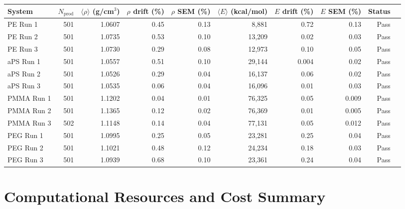\documentclass[journal=acsami,manuscript=suppinfo]{achemso}
\begin{document}
\begin{adjustbox}{max width=\textwidth}
\begin{tabular}{lrrrrrrrrl}
\toprule
\textbf{System} & $N_{\text{prod}}$ & $\langle \rho \rangle$ (g/cm$^3$) & $\rho$ drift (\%) & $\rho$ SEM (\%) & $\langle E \rangle$ (kcal/mol) & $E$ drift (\%) & $E$ SEM (\%) & \textbf{Status} \\
\midrule
PE Run 1   & 501  & 1.0607 & 0.45 & 0.13 & 8{,}881   & 0.72 & 0.13 & Pass \\
PE Run 2   & 501  & 1.0735 & 0.53 & 0.10 & 13{,}209  & 0.02 & 0.03 & Pass \\
PE Run 3   & 501  & 1.0730 & 0.29 & 0.08 & 12{,}973  & 0.10 & 0.05 & Pass \\
\midrule
aPS Run 1  & 501  & 1.0557 & 0.51 & 0.10 & 29{,}144  & 0.004 & 0.02 & Pass \\
aPS Run 2  & 501  & 1.0526 & 0.29 & 0.04 & 16{,}137  & 0.06 & 0.02 & Pass \\
aPS Run 3  & 501  & 1.0535 & 0.06 & 0.04 & 16{,}096  & 0.01 & 0.03 & Pass \\
\midrule
PMMA Run 1 & 501  & 1.1202 & 0.04 & 0.01 & 76{,}325  & 0.05 & 0.009 & Pass \\
PMMA Run 2 & 501  & 1.1365 & 0.12 & 0.02 & 76{,}369  & 0.01 & 0.005 & Pass \\
PMMA Run 3 & 502 & 1.1148 & 0.14 & 0.04 & 77{,}131  & 0.05 & 0.012 & Pass \\
\midrule
PEG Run 1  & 501  & 1.0995 & 0.25 & 0.05 & 23{,}281  & 0.25 & 0.04 & Pass \\
PEG Run 2  & 501  & 1.1021 & 0.48 & 0.12 & 24{,}234  & 0.18 & 0.03 & Pass \\
PEG Run 3  & 501  & 1.0939 & 0.68 & 0.10 & 23{,}361  & 0.24 & 0.04 & Pass \\
\bottomrule
\end{tabular}
\end{adjustbox}
\label{tab:si_convergence}


\section{Computational Resources and Cost Summary}
\label{sec:si_cost}
\end{document}
